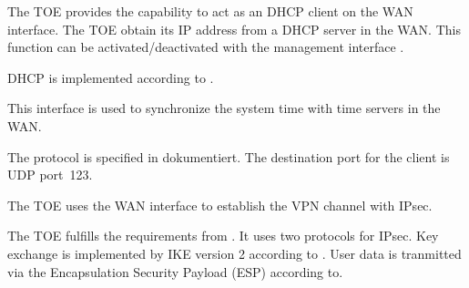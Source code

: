 



The TOE provides the capability to act as an DHCP client on the WAN
interface. The TOE obtain its IP address from a DHCP server in the WAN. This function can be activated/deactivated with the management interface \lslanhttpmgmt{}.



DHCP is implemented according to .





This interface is used to synchronize the system time with time servers in the
WAN.



The protocol is specified in  dokumentiert. The destination port
for the client is UDP port~123.






The TOE uses the WAN interface to establish the VPN channel with IPsec.



The TOE fulfills the requirements from . It uses two protocols for
IPsec. Key exchange is implemented by IKE version 2 according to
. User data is tranmitted via the Encapsulation Security Payload
(ESP) according to. 




